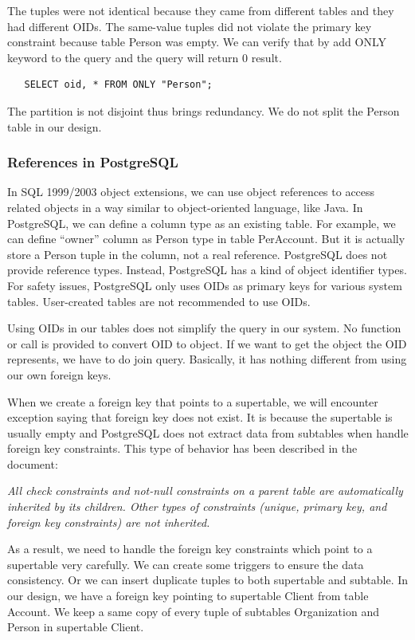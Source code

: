 \documentclass[11pt]{article}
\begin{document}
\par
The tuples were not identical because they came from different tables and they had different OIDs. The same-value tuples did not violate the primary key constraint because table Person was empty. We can verify that by add ONLY keyword to the query and the query will return 0 result.
\begin{verbatim}
   SELECT oid, * FROM ONLY "Person";
\end{verbatim}

\par
The partition is not disjoint thus brings redundancy. We do not split the Person table in our design.

\subsubsection{References in PostgreSQL}
\label{sec:refinpgsql}
\par
In SQL 1999/2003 object extensions, we can use object references to access related objects in a way similar to object-oriented language, like Java. In PostgreSQL, we can define a column type as an existing table. For example, we can define ``owner'' column as Person type in table PerAccount. But it is actually store a Person tuple in the column, not a real reference. PostgreSQL does not provide reference types. Instead, PostgreSQL has a kind of object identifier types. For safety issues, PostgreSQL only uses OIDs as primary keys for various system tables. User-created tables are not recommended to use OIDs.
\par
Using OIDs in our tables does not simplify the query in our system. No function or call is provided to convert OID to object. If we want to get the object the OID represents, we have to do join query. Basically, it has nothing different from using our own foreign keys.
\par
When we create a foreign key that points to a supertable, we will encounter exception saying that foreign key does not exist. It is because the supertable is usually empty and PostgreSQL does not extract data from subtables when handle foreign key constraints. This type of behavior has been described in the document:
\par
\emph{All check constraints and not-null constraints on a parent table are automatically inherited by its children. Other types of constraints (unique, primary key, and foreign key constraints) are not inherited.}
\par
As a result, we need to handle the foreign key constraints which point to a supertable very carefully. We can create some triggers to ensure the data consistency. Or we can insert duplicate tuples to both supertable and subtable. In our design, we have a foreign key pointing to supertable Client from table Account. We keep a same copy of every tuple of subtables Organization and Person in supertable Client.
\end{document}
